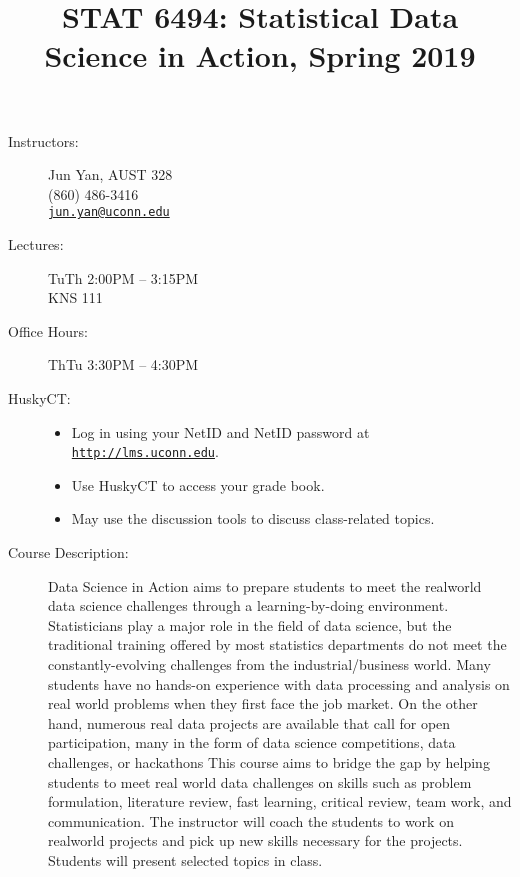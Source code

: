 \documentclass[twocolumn, 11pt]{article}
\title{STAT 6494: Statistical Data Science in Action, Spring 2019\vspace{-.75in}}
\date{}
\newcommand*{\email}[1]{\href{mailto:#1}{\nolinkurl{#1}} }
\begin{document}
\maketitle
\thispagestyle{fancy}

\begin{description}
\item[Instructors:] \hspace{0pt}
  
  Jun Yan, AUST 328\\
  (860) 486-3416\\ \email{jun.yan@uconn.edu}
  

\item[Lectures:] \hspace{0pt}

TuTh 2:00PM -- 3:15PM\\ 
KNS 111

\item[Office Hours:] \hspace{0pt}
ThTu  3:30PM -- 4:30PM


\item[HuskyCT:] \hspace{0pt}

\begin{itemize}
\item Log in using your NetID and NetID password
  at \href{http://lms.uconn.edu}{\texttt{http://lms.uconn.edu}}.
\item Use HuskyCT to access your grade book.
\item May use the discussion tools to discuss class-related topics.
\end{itemize}

\item[Course Description:]

Data Science in Action aims to prepare students to meet the realworld
data science challenges through a learning-by-doing environment.
Statisticians play a major role in the field of data science, but
the traditional training offered by most statistics departments do not
meet the constantly-evolving challenges from the industrial/business world.
Many students have no hands-on experience with data processing and
analysis on real world problems when they first face the job market.
On the other hand, numerous real data projects are available that
call for open participation, many in the form of data science
competitions, data challenges, or hackathons
This course aims to bridge the gap by helping students to meet real
world data challenges on skills such as problem formulation,
literature review, fast learning, critical review, team work, and
communication. The instructor will coach the students to work on
realworld projects and pick up new skills necessary for the projects.
Students will present selected topics in class.


\end{description}
\end{document}
